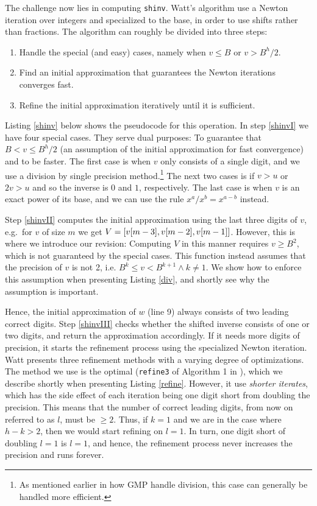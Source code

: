 The challenge now lies in computing \texttt{shinv}. Watt's algorithm use a
Newton iteration over integers and specialized to the base, in order to use
shifts rather than fractions. The algorithm can roughly be divided into three
steps:
\begin{enumerate}[label=\Roman*]
\item Handle the special (and easy) cases, namely when $v \leq B$ or $v > B^h/2$.\label{shinvI}
\item Find an initial approximation that guarantees the Newton iterations
  converges fast.\label{shinvII}
\item Refine the initial approximation iteratively until it is sufficient.\label{shinvIII}
\end{enumerate}
Listing \ref{shinv} below shows the pseudocode for this operation. In step
\ref{shinvI} we have four special cases. They serve dual purposes: To guarantee
that $B < v \leq B^h/2$ (an assumption of the initial approximation for fast
convergence) and to be faster. The first case is when $v$ only consists of a
single digit, and we use a division by single precision method.\footnote{As
  mentioned earlier in how GMP handle division, this case can generally be
  handled more efficient.} The next two cases is if $v > u$ or $2v > u$ and so
the inverse is $0$ and $1$, respectively. The last case is when $v$ is an exact
power of its base, and we can use the rule $x^a/x^b=x^{a-b}$ instead.

Step \ref{shinvII} computes the initial approximation using the last three
digits of $v$, e.g.\ for $v$ of size $m$ we get $V= \mathtt{[}v[m-3],v[m-2],v[m-1]\mathtt{]}$.
However, this is where we introduce our revision: Computing $V$ in this manner
requires $v \geq B^2$, which is not guaranteed by the special cases. This function
instead assumes that the precision of $v$ is not 2, i.e.
$B^k\leq v < B^{k+1} \land k \neq 1$. We show how to enforce this assumption when
presenting Listing \ref{div}, and shortly see why the assumption is important.

Hence, the initial approximation of $w$ (line 9) always consists of two leading
correct digits. Step \ref{shinvIII} checks whether the shifted inverse consists
of one or two digits, and return the approximation accordingly. If it needs more
digits of precision, it starts the refinement process using the specialized
Newton iteration. Watt presents three refinement methods with a varying degree
of optimizations. The method we use is the optimal (\texttt{refine3} of
Algorithm 1 in \cite{watt2023efficient}), which we describe shortly when
presenting Listing \ref{refine}. However, it use \textit{shorter iterates},
which has the side effect of each iteration being one digit short from doubling
the precision. This means that the number of correct leading digits, from now on
referred to as $l$, must be $\geq 2$. Thus, if $k = 1$ and we are in the case where
$h-k>2$, then we would start refining on $l=1$. In turn, one digit short of
doubling $l=1$ is $l=1$, and hence, the refinement process never increases the
precision and runs forever.

